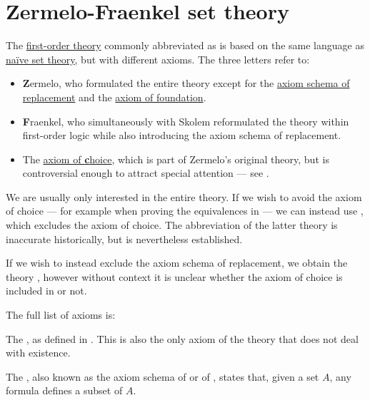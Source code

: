 \section{Zermelo-Fraenkel set theory}\label{sec:zermelo_fraenkel_set_theory}

\begin{definition}\label{def:zfc}
  The \hyperref[def:first_order_theory]{first-order theory} commonly abbreviated as  is based on the same language as \hyperref[def:naive_set_theory]{na\"ive set theory}, but with different axioms. The three letters refer to:
  \begin{itemize}
    \item \textbf{Z}ermelo, who formulated the entire theory except for the \hyperref[def:zfc/replacement]{axiom schema of replacement} and the \hyperref[def:zfc/foundation]{axiom of foundation}.
    \item \textbf{F}raenkel, who simultaneously with Skolem reformulated the theory within first-order logic while also introducing the axiom schema of replacement.
    \item The \hyperref[def:zfc/choice]{axiom of \textbf{c}hoice}, which is part of Zermelo's original theory, but is controversial enough to attract special attention --- see .
  \end{itemize}

  We are usually only interested in the entire theory. If we wish to avoid the axiom of choice --- for example when proving the equivalences in  --- we can instead use , which excludes the axiom of choice. The abbreviation of the latter theory is inaccurate historically, but is nevertheless established.

  If we wish to instead exclude the axiom schema of replacement, we obtain the theory , however without context it is unclear whether the axiom of choice is included in  or not.

  The full list of axioms is:
  \begin{thmenum}
     The , as defined in . This is also the only axiom of the theory that does not deal with existence.

     The , also known as the axiom schema of  or of , states that, given a set \( A \), any formula defines a subset of \( A \).


\end{thmenum}
\end{definition}
